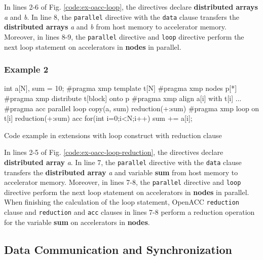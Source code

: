 In lines 2-6 of Fig. \ref{code:ex-oacc-loop},
the directives declare {\bf distributed arrays} {\it a} and {\it b}.
In line 8,
the {\tt parallel} directive with the {\tt data} clause transfers the
{\bf distributed arrays} {\it a} and {\it b} from host memory to
accelerator memory.
Moreover,
in lines 8-9,
the {\tt parallel} directive and {\XMP} {\tt loop} directive perform the
next loop statement on accelerators in {\bf nodes} in parallel.

\subsubsection*{Example 2}
\begin{myfigure}
\begin{center}
\begin{XACCCexampleL}
int a[N], sum = 10;
#pragma xmp template t[N]
#pragma xmp nodes p[*]
#pragma xmp distribute t[block] onto p
#pragma xmp align a[i] with t[i]
...
#pragma acc parallel loop copy(a, sum) reduction(+:sum)
#pragma xmp loop on t[i] reduction(+:sum) acc
for(int i=0;i<N;i++){
  sum += a[i];
}
\end{XACCCexampleL}
\end{center}
\caption{Code example in {\XMP} extensions with {\OACC} loop construct
  with reduction clause}\label{code:ex-oacc-loop-reduction}
\end{myfigure}

In lines 2-5 of Fig. \ref{code:ex-oacc-loop-reduction},
the directives declare {\bf distributed array} {\it a}.
In line 7,
the {\tt parallel} directive with the {\tt data} clause transfers the
{\bf distributed array} {\it a} and variable {\bf sum} from host memory
to accelerator memory.
Moreover,
in lines 7-8,
the {\tt parallel} directive and {\XMP} {\tt loop} directive perform the
next loop statement on accelerators in {\bf nodes} in parallel.
When finishing the calculation of the loop statement,
OpenACC {\tt reduction} clause and {\XMP} {\tt reduction} and {\tt acc}
clauses in lines 7-8 perform a reduction operation for the variable {\bf
sum} on accelerators in {\bf nodes}.


\subsection{Data Communication and Synchronization}

